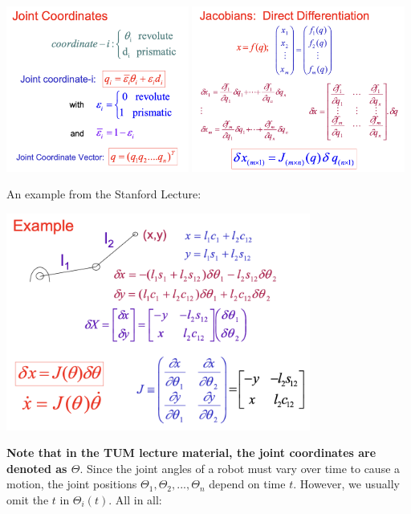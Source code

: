 \begin{center}
	\includegraphics[width=6cm]{sections/imgs/4_joint_coordinates.png}
	\includegraphics[width=7cm]{sections/imgs/4_direct_diff.png}
\end{center}

An example from the Stanford Lecture:

\begin{center}
	\includegraphics[width=10cm]{sections/imgs/4_position_derivative_example.png}
\end{center}

\textbf{Note that in the TUM lecture material, the joint coordinates are denoted as $\Theta$}. Since the joint angles of a robot must vary over time to cause a motion, the joint positions $ \Theta_{1} , \Theta_{2} , ..., \Theta_{n} $ depend on time $ t $. However, we usually omit the $t$ in $ \Theta_{i} (t) $. All in all:

